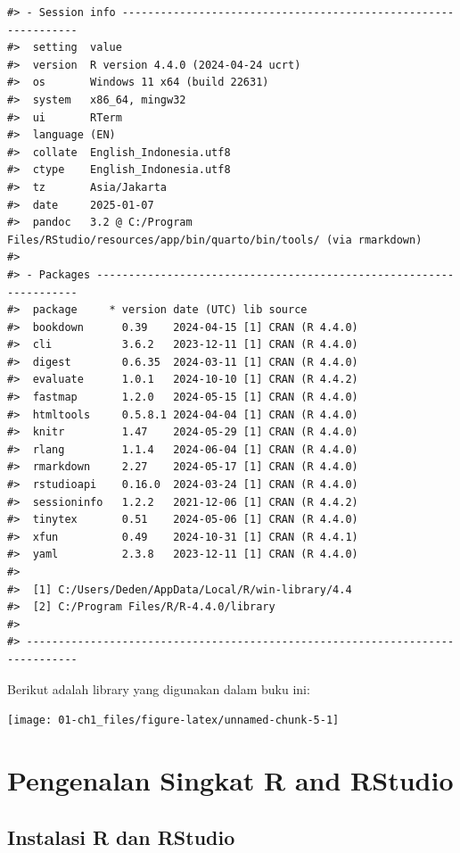 \documentclass[
  oneside]{book}
\begin{document}
\begin{verbatim}
#> - Session info ---------------------------------------------------------------
#>  setting  value
#>  version  R version 4.4.0 (2024-04-24 ucrt)
#>  os       Windows 11 x64 (build 22631)
#>  system   x86_64, mingw32
#>  ui       RTerm
#>  language (EN)
#>  collate  English_Indonesia.utf8
#>  ctype    English_Indonesia.utf8
#>  tz       Asia/Jakarta
#>  date     2025-01-07
#>  pandoc   3.2 @ C:/Program Files/RStudio/resources/app/bin/quarto/bin/tools/ (via rmarkdown)
#> 
#> - Packages -------------------------------------------------------------------
#>  package     * version date (UTC) lib source
#>  bookdown      0.39    2024-04-15 [1] CRAN (R 4.4.0)
#>  cli           3.6.2   2023-12-11 [1] CRAN (R 4.4.0)
#>  digest        0.6.35  2024-03-11 [1] CRAN (R 4.4.0)
#>  evaluate      1.0.1   2024-10-10 [1] CRAN (R 4.4.2)
#>  fastmap       1.2.0   2024-05-15 [1] CRAN (R 4.4.0)
#>  htmltools     0.5.8.1 2024-04-04 [1] CRAN (R 4.4.0)
#>  knitr         1.47    2024-05-29 [1] CRAN (R 4.4.0)
#>  rlang         1.1.4   2024-06-04 [1] CRAN (R 4.4.0)
#>  rmarkdown     2.27    2024-05-17 [1] CRAN (R 4.4.0)
#>  rstudioapi    0.16.0  2024-03-24 [1] CRAN (R 4.4.0)
#>  sessioninfo   1.2.2   2021-12-06 [1] CRAN (R 4.4.2)
#>  tinytex       0.51    2024-05-06 [1] CRAN (R 4.4.0)
#>  xfun          0.49    2024-10-31 [1] CRAN (R 4.4.1)
#>  yaml          2.3.8   2023-12-11 [1] CRAN (R 4.4.0)
#> 
#>  [1] C:/Users/Deden/AppData/Local/R/win-library/4.4
#>  [2] C:/Program Files/R/R-4.4.0/library
#> 
#> ------------------------------------------------------------------------------
\end{verbatim}

Berikut adalah library yang digunakan dalam buku ini:

\begin{center}\texttt{[image: 01-ch1\_files/figure-latex/unnamed-chunk-5-1]} \end{center}

\section{Pengenalan Singkat R and RStudio}\label{pengenalan-singkat-r-and-rstudio}

\subsection*{Instalasi R dan RStudio}\label{instalasi-r-dan-rstudio}
\end{document}
